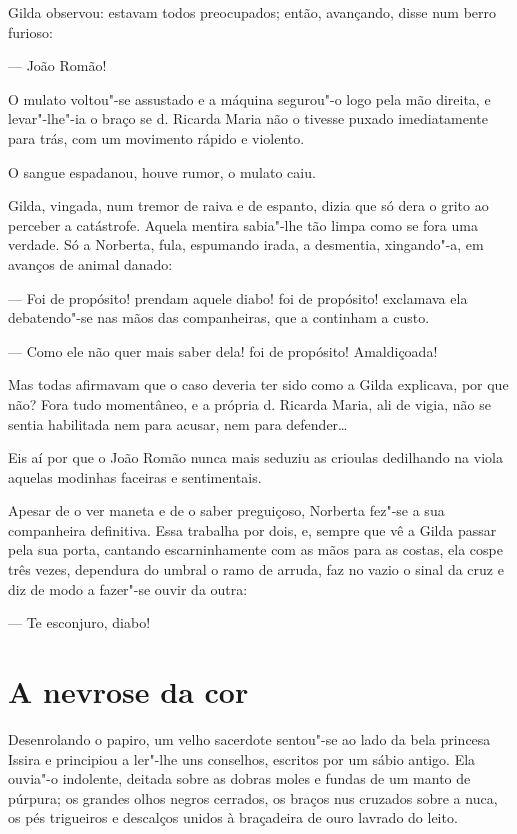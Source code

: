 Gilda observou: estavam todos preocupados; então, avançando, disse num
berro furioso:

--- João Romão!

O mulato voltou"-se assustado e a máquina segurou"-o logo pela mão
direita, e levar"-lhe"-ia o braço se d. Ricarda Maria não o tivesse puxado
imediatamente para trás, com um movimento rápido e violento.

O sangue espadanou, houve rumor, o mulato caiu.

Gilda, vingada, num tremor de raiva e de espanto, dizia que só dera o
grito ao perceber a catástrofe. Aquela mentira sabia"-lhe tão limpa como
se fora uma verdade. Só a Norberta, fula, espumando irada, a desmentia,
xingando"-a, em avanços de animal danado:

--- Foi de propósito! prendam aquele diabo! foi de propósito! exclamava
ela debatendo"-se nas mãos das companheiras, que a continham a custo.

--- Como ele não quer mais saber dela! foi de propósito! Amaldiçoada!

Mas todas afirmavam que o caso deveria ter sido como a Gilda explicava,
por que não? Fora tudo momentâneo, e a própria d. Ricarda Maria, ali de
vigia, não se sentia habilitada nem para acusar, nem para defender\ldots{}

Eis aí por que o João Romão nunca mais seduziu as crioulas dedilhando na
viola aquelas modinhas faceiras e sentimentais.

Apesar de o ver maneta e de o saber preguiçoso, Norberta fez"-se a sua
companheira definitiva. Essa trabalha por dois, e, sempre que vê a Gilda
passar pela sua porta, cantando escarninhamente com as mãos para as
costas, ela cospe três vezes, dependura do umbral o ramo de arruda, faz
no vazio o sinal da cruz e diz de modo a fazer"-se ouvir da outra:

--- Te esconjuro, diabo!

\chapter{A nevrose da cor}

Desenrolando o papiro, um velho sacerdote sentou"-se ao lado da bela
princesa Issira e principiou a ler"-lhe uns conselhos, escritos por um
sábio antigo. Ela ouvia"-o indolente, deitada sobre as dobras moles e
fundas de um manto de púrpura; os grandes olhos negros cerrados, os
braços nus cruzados sobre a nuca, os pés trigueiros e descalços unidos à
braçadeira de ouro lavrado do leito.

